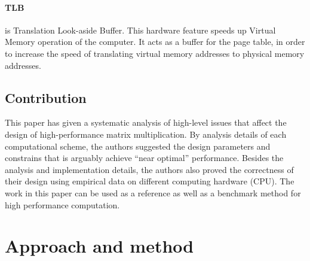 \documentclass[a4paper,12pt]{article}
\begin{document}
\paragraph{TLB} is Translation Look-aside Buffer. This hardware feature speeds up Virtual Memory operation of the computer. It acts as a buffer for the page table, in order to increase the speed of translating virtual memory addresses to physical memory addresses.


\subsection{Contribution}
\noindent
This paper has given a systematic analysis of high-level issues that affect the design of high-performance matrix multiplication. By analysis details of each computational scheme, the authors suggested the design parameters and constrains that is arguably achieve ``near optimal'' performance. Besides the analysis and implementation details, the authors also proved the correctness of their design using empirical data on different computing hardware (CPU). The work in this paper can be used as a reference as well as a benchmark method for high performance computation.





\section{Approach and method}
\end{document}
